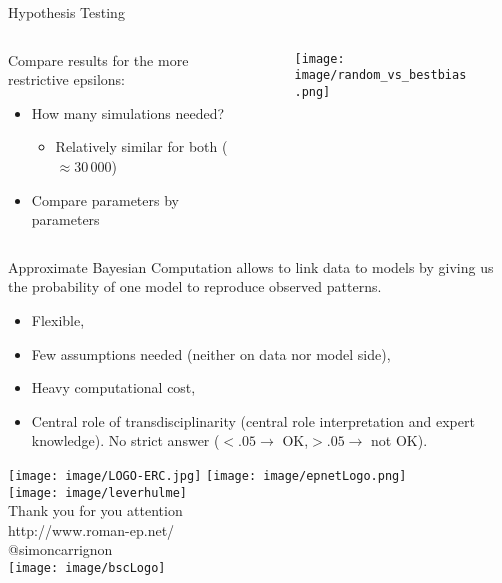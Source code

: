 \documentclass[10pt, notes=show]{beamer}
\begin{document}
\begin{frame}{Hypothesis Testing}
    \begin{columns}

        \begin{column}{0.6\linewidth}
    Compare results for the more restrictive epsilons:
    \begin{itemize}
        \item<+-> How many simulations needed? 
            \begin{itemize}
                \item<+-> Relatively similar for both ($\approx 30\,000$)
            \end{itemize}
        \item<+-> Compare parameters by parameters
    \end{itemize}
        \end{column}
        \begin{column}{0.45\linewidth}
    \begin{figure}
        \texttt{[image: image/random\_vs\_bestbias.png]}
    \end{figure}

        \end{column}

    \end{columns}
\end{frame}

\begin{frame}
    Approximate Bayesian Computation allows to link data to models by giving us the probability of one model to reproduce observed patterns.
    \begin{itemize}
        \item<+-> Flexible,
        \item<+-> Few assumptions needed (neither on data nor model side),
        \item<+-> Heavy computational cost,
        \item<+-> Central role of transdisciplinarity (central role interpretation and expert knowledge). No strict answer ($<.05 \rightarrow$ OK,$>.05 \rightarrow$ not OK).
    \end{itemize}
    
\end{frame}

\begin{frame}
	\begin{center}
		\texttt{[image: image/LOGO-ERC.jpg]} \hfil	\texttt{[image: image/epnetLogo.png]}\\
		\texttt{[image: image/leverhulme]}\\
		\vspace{.5cm}
		Thank you for you attention\\
		\vspace{.5cm}
		\scriptsize
			http://www.roman-ep.net/\\
			@simoncarrignon\\
		\vspace{.5cm}
		\texttt{[image: image/bscLogo]}\\
	\end{center}


\end{frame}
\end{document}
